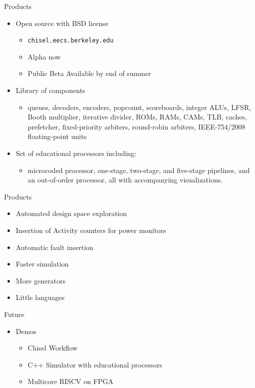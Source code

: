 \documentclass[xcolor=pdflatex,dvipsnames,table]{beamer}
\begin{document}
\begin{frame}[fragile]{Products}

\begin{itemize}
\item Open source with BSD license
\begin{itemize}
\item \verb+chisel.eecs.berkeley.edu+
\item Alpha now
\item Public Beta Available by end of summer
\end{itemize}
\item Library of components
\begin{itemize}
\item queues, decoders, encoders, popcount, scoreboards, integer ALUs, LFSR, Booth multiplier, iterative divider, ROMs, RAMs, CAMs, TLB, caches, prefetcher, fixed-priority arbiters, round-robin arbiters, IEEE-754/2008 floating-point units
\end{itemize}
\item Set of educational processors including:
\begin{itemize}
\item microcoded processor, one-stage, two-stage, and five-stage pipelines, and an out-of-order processor, all with accompanying visualizations.
\end{itemize}
\end{itemize}

\end{frame}

\begin{frame}[fragile]{Products}

\begin{itemize}
\item Automated design space exploration
\item Insertion of Activity counters for power monitors
\item Automatic fault insertion
\item Faster simulation
\item More generators
\item Little languages
\end{itemize}

\end{frame}

\begin{frame}[fragile]{Future}

\begin{itemize}
\item Demos
\begin{itemize}
\item Chisel Workflow
\item C++ Simulator with educational processors
\item Multicore RISCV on FPGA
\end{itemize}
\end{itemize}

\end{frame}
\end{document}
